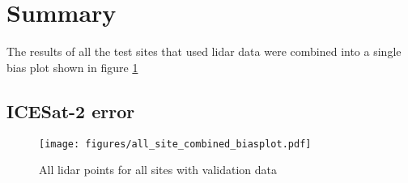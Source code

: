\section{Summary}
The results of all the test sites that used lidar data were combined into a single bias plot shown in figure \ref{fig:all-sites-biasplot}

\subsection{ICESat-2 error}

\begin{figure}[h]
    \centering
    \texttt{[image: figures/all\_site\_combined\_biasplot.pdf]}
    \caption{All lidar points for all sites with validation data}
    \label{fig:all-sites-biasplot}
\end{figure}

